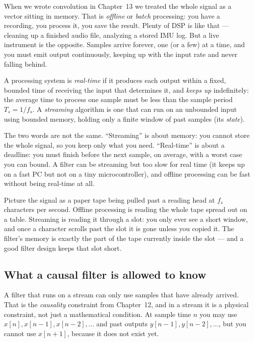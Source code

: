 When we wrote convolution in Chapter~13 we treated the whole signal as a vector
sitting in memory. That is \emph{offline} or \emph{batch} processing: you have a
recording, you process it, you save the result. Plenty of DSP is like that ---
cleaning up a finished audio file, analyzing a stored IMU log. But a live
instrument is the opposite. Samples arrive forever, one (or a few) at a time,
and you must emit output continuously, keeping up with the input rate and never
falling behind.

\begin{definition}
A processing system is \emph{real-time} if it produces each output within a
fixed, bounded time of receiving the input that determines it, and \emph{keeps
up} indefinitely: the average time to process one sample must be less than the
sample period $T_s = 1/f_s$. A \emph{streaming} algorithm is one that can run on
an unbounded input using bounded memory, holding only a finite window of past
samples (its \emph{state}).
\end{definition}

The two words are not the same. ``Streaming'' is about memory: you cannot store
the whole signal, so you keep only what you need. ``Real-time'' is about a
deadline: you must finish before the next sample, on average, with a worst case
you can bound. A filter can be streaming but too slow for real time (it keeps
up on a fast PC but not on a tiny microcontroller), and offline processing can
be fast without being real-time at all.

\begin{intuitionbox}
Picture the signal as a paper tape being pulled past a reading head at $f_s$
characters per second. Offline processing is reading the whole tape spread out
on a table. Streaming is reading it through a slot: you only ever see a short
window, and once a character scrolls past the slot it is gone unless you copied
it. The filter's memory is exactly the part of the tape currently inside the
slot --- and a good filter design keeps that slot short.
\end{intuitionbox}

\subsection{What a causal filter is allowed to know}

A filter that runs on a stream can only use samples that have already arrived.
That is the \emph{causality} constraint from Chapter~12, and in a stream it is a
physical constraint, not just a mathematical condition. At sample time $n$ you may use
$x[n], x[n-1], x[n-2],\dots$ and past outputs $y[n-1],y[n-2],\dots$, but you
cannot use $x[n+1]$, because it does not exist yet.

